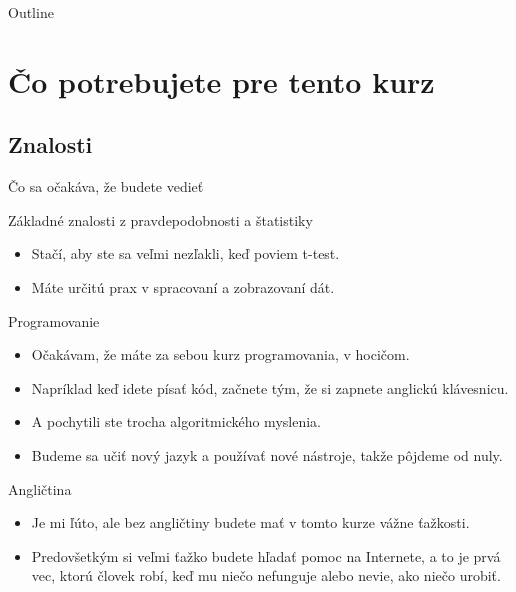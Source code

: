 
\begin{frame}{Outline}
\tableofcontents
\end{frame}

\section{Čo potrebujete pre tento kurz}

\subsection{Znalosti}
\begin{frame}{Čo sa očakáva, že budete vedieť}
	\begin{block}{Základné znalosti z pravdepodobnosti a štatistiky}
		\begin{itemize}
			\item Stačí, aby ste sa veľmi nezľakli, keď poviem t-test.
			\item Máte určitú prax v spracovaní a zobrazovaní dát.
		\end{itemize}
	\end{block}
	\begin{block}{Programovanie}
		\begin{itemize}
			\item Očakávam, že máte za sebou kurz programovania, v hocičom.
			\item Napríklad keď idete písať kód, začnete tým, že si zapnete anglickú klávesnicu.
			\item A pochytili ste trocha algoritmického myslenia. 
			\item Budeme sa učiť nový jazyk a používať nové nástroje, takže pôjdeme od nuly.
		\end{itemize}
	\end{block}
	\begin{block}{Angličtina}
		\begin{itemize}
			\item Je mi ľúto, ale bez angličtiny budete mať v tomto kurze vážne ťažkosti.
			\item Predovšetkým si veľmi ťažko budete hľadať pomoc na Internete, a to je prvá vec, ktorú človek robí, keď mu niečo nefunguje alebo nevie, ako niečo urobiť. 
		\end{itemize}
	\end{block}
\end{frame}

